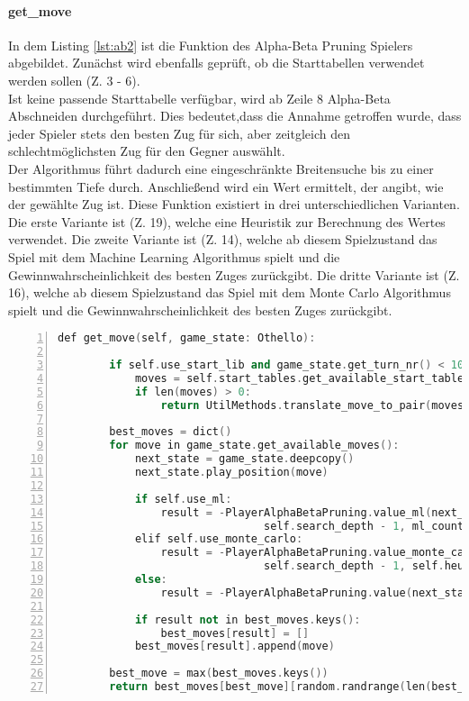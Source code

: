 \paragraph{get\_move}
In dem Listing \ref{lst:ab2} ist die  Funktion des Alpha-Beta Pruning Spielers abgebildet.
Zunächst wird ebenfalls geprüft, ob die Starttabellen verwendet werden sollen (Z. 3 - 6).
\\Ist keine passende Starttabelle verfügbar, wird ab Zeile 8 Alpha-Beta Abschneiden durchgeführt.
Dies bedeutet,dass die Annahme getroffen wurde, dass jeder Spieler stets den besten Zug für sich, aber zeitgleich den schlechtmöglichsten Zug für den Gegner auswählt.
\\Der Algorithmus führt dadurch eine eingeschränkte Breitensuche bis zu einer bestimmten Tiefe durch.
Anschließend wird ein Wert ermittelt, der angibt, wie  der gewählte Zug ist.
Diese Funktion  existiert in drei unterschiedlichen Varianten.
Die erste Variante ist  (Z. 19), welche eine Heuristik zur Berechnung des Wertes verwendet.  
Die zweite Variante ist  (Z. 14), welche ab diesem Spielzustand das Spiel mit dem Machine Learning Algorithmus spielt und die Gewinnwahrscheinlichkeit des besten Zuges zurückgibt.
Die dritte Variante ist  (Z. 16), welche ab diesem Spielzustand das Spiel mit dem Monte Carlo Algorithmus spielt und die Gewinnwahrscheinlichkeit des besten Zuges zurückgibt.
\begin{lstlisting}[caption = {get\_move Funktion des Alpha-Beta Spielers}, language = cpp, captionpos = t , numbers=left, label={lst:ab2}]
    def get_move(self, game_state: Othello):

        if self.use_start_lib and game_state.get_turn_nr() < 10:  # check whether start move match
            moves = self.start_tables.get_available_start_tables(game_state)
            if len(moves) > 0:
                return UtilMethods.translate_move_to_pair(moves[random.randrange(len(moves))])
        
        best_moves = dict()
        for move in game_state.get_available_moves():
            next_state = game_state.deepcopy()
            next_state.play_position(move)

            if self.use_ml:
                result = -PlayerAlphaBetaPruning.value_ml(next_state, 
                				self.search_depth - 1, ml_count=self.ml_count)
            elif self.use_monte_carlo:
                result = -PlayerAlphaBetaPruning.value_monte_carlo(next_state, 
                				self.search_depth - 1, self.heuristic, mc_count=self.ml_count)
            else:
                result = -PlayerAlphaBetaPruning.value(next_state, self.search_depth - 1, self.heuristic)

            if result not in best_moves.keys():
                best_moves[result] = []
            best_moves[result].append(move)

        best_move = max(best_moves.keys())
        return best_moves[best_move][random.randrange(len(best_moves[best_move]))]
\end{lstlisting}
